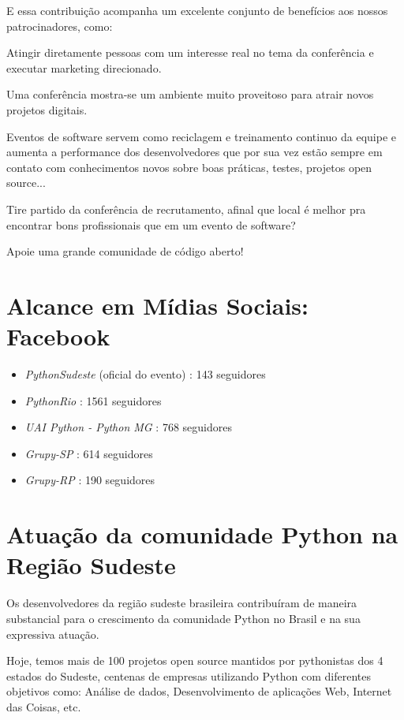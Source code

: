 \documentclass[12pt]{article}
\begin{document}
E essa contribuição acompanha um excelente conjunto de benefícios aos nossos patrocinadores, como:
\begin{description}[align=right,labelwidth=4cm]
    \item [Visibilidade:] Atingir diretamente pessoas com um interesse real no tema da conferência e executar marketing direcionado.
    \item [Oportunidades:] Uma conferência mostra-se um ambiente muito proveitoso para atrair novos projetos digitais.
    \item [Produtividade:] Eventos de software servem como reciclagem e treinamento continuo da equipe e aumenta a performance dos desenvolvedores que por sua vez estão sempre em contato com conhecimentos novos sobre boas práticas, testes, projetos open source...
    \item [Contratação:] Tire partido da conferência de recrutamento, afinal que local é melhor pra encontrar bons profissionais que em um evento de software?
    \item [Patrocínio:] Apoie uma grande comunidade de código aberto!
\end{description}

\section{Alcance em Mídias Sociais: Facebook}
\begin{itemize}[label={}]
    \item \emph{PythonSudeste} (oficial do evento) : 143 seguidores
    \item \emph{PythonRio} : 1561 seguidores
    \item \emph{UAI Python - Python MG } : 768 seguidores
    \item \emph{Grupy-SP} :  614 seguidores
    \item \emph{Grupy-RP} : 190 seguidores
\end{itemize}

\section{Atuação da comunidade Python na Região Sudeste}

Os desenvolvedores da região sudeste brasileira contribuíram de maneira substancial para o crescimento da comunidade Python no Brasil e na sua expressiva atuação. 

Hoje, temos mais de 100 projetos open source mantidos por pythonistas dos 4 estados do Sudeste, centenas de empresas utilizando Python com diferentes objetivos como: Análise de dados, Desenvolvimento de aplicações Web, Internet das Coisas, etc.
\end{document}
